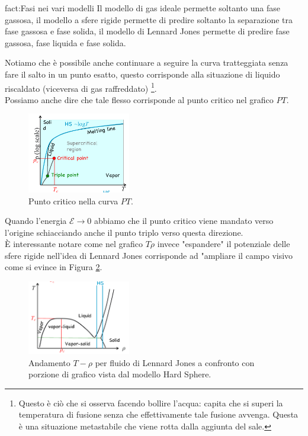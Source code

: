 \newpage
\begin{fact}{fact:Fasi nei vari modelli}
	Il modello di gas ideale permette soltanto una fase gassosa, il modello a sfere
	rigide permette di predire soltanto la separazione tra fase gassosa e fase solida,
	il modello di Lennard Jones permette di predire fase gassosa, fase liquida 
	e fase solida.
\end{fact}
Notiamo che è possibile anche continuare a seguire la curva tratteggiata senza fare il salto in un punto esatto, questo corrisponde alla situazione di liquido riscaldato (viceversa di gas raffreddato)
\footnote{Questo è ciò che si osserva facendo bollire l'acqua: capita che si superi la temperatura di fusione senza che effettivamente tale fusione avvenga. Questa è una situazione metastabile che viene rotta dalla aggiunta del sale.}.\\
Possiamo anche dire che tale flesso corrisponde al punto critico nel grafico $PT$.
\begin{figure}[ht]
	\centering
	\includegraphics[width=0.4\textwidth]{figures/Punto-triplo.png}
	\caption{Punto critico nella curva $PT$.}
	\label{fig:figures-Punto-triplo-png}
\end{figure}
Quando l'energia $\mathcal{E}\to 0$ abbiamo che il punto critico viene mandato verso l'origine schiacciando anche il punto triplo verso questa direzione.\\
È interessante notare come nel grafico $T\rho $ invece "espandere" il potenziale delle sfere rigide nell'idea di Lennard Jones corrisponde ad "ampliare il campo visivo come si evince in Figura \ref{fig:figures-grafico-T-rho-png}.
\begin{figure}[ht]
	\centering
	\includegraphics[width=0.4\textwidth]{figures/grafico-T-rho.png}
	\caption{\scriptsize Andamento $T-\rho $ per fluido di Lennard Jones a confronto con porzione di grafico vista dal modello Hard Sphere.}
	\label{fig:figures-grafico-T-rho-png}
\end{figure}
